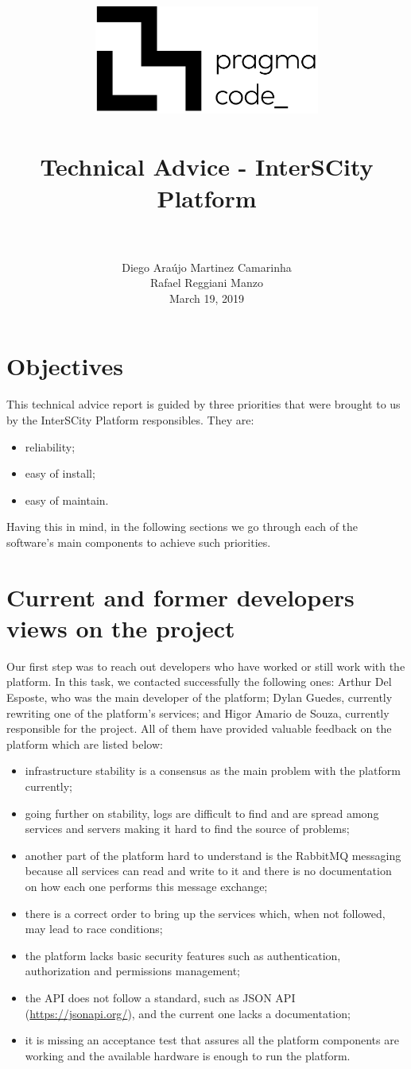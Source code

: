 \documentclass[paper=a4, fontsize=11pt]{scrartcl}
\title{
  \usefont{OT1}{bch}{b}{n}
  \normalfont \normalsize \includegraphics[width=10em]{pc_h_preto} \\ [25pt]
  \horrule{0.5pt} \\[0.4cm]
  \huge Technical Advice - InterSCity Platform \\
  \horrule{2pt} \\[0.5cm]
}
\author{
  \normalfont \normalsize
  Diego Araújo Martinez Camarinha\\[-3pt]    \normalsize
  Rafael Reggiani Manzo\\[-3pt]    \normalsize
  March 19, 2019
}
\date{}
\numberwithin{equation}{section}    %
\numberwithin{figure}{section}      %
\numberwithin{table}{section}        %
\begin{document}
\maketitle

\section{Objectives}
  This technical advice report is guided by three priorities that were brought to us by the InterSCity Platform responsibles. They are:

  \begin{itemize}
    \item reliability;
    \item easy of install;
    \item easy of maintain.
  \end{itemize}

  Having this in mind, in the following sections we go through each of the software's main components to achieve such priorities.

\section{Current and former developers views on the project}
\label{sec:developers}
  Our first step was to reach out developers who have worked or still work with the platform. In this task, we contacted successfully the following ones: Arthur Del Esposte, who was the main developer of the platform; Dylan Guedes, currently rewriting one of the platform's services; and Higor Amario de Souza, currently responsible for the project. All of them have provided valuable feedback on the platform which are listed below:

  \begin{itemize}
    \item infrastructure stability is a consensus as the main problem with the platform currently;
    \item going further on stability, logs are difficult to find and are spread among services and servers making it hard to find the source of problems;
    \item another part of the platform hard to understand is the RabbitMQ messaging because all services can read and write to it and there is no documentation on how each one performs this message exchange;
    \item there is a correct order to bring up the services which, when not followed, may lead to race conditions;
    \item the platform lacks basic security features such as authentication, authorization and permissions management;
    \item the API does not follow a standard, such as JSON API (\url{https://jsonapi.org/}), and the current one lacks a documentation;
    \item it is missing an acceptance test that assures all the platform components are working and the available hardware is enough to run the platform.
  \end{itemize}
\end{document}
